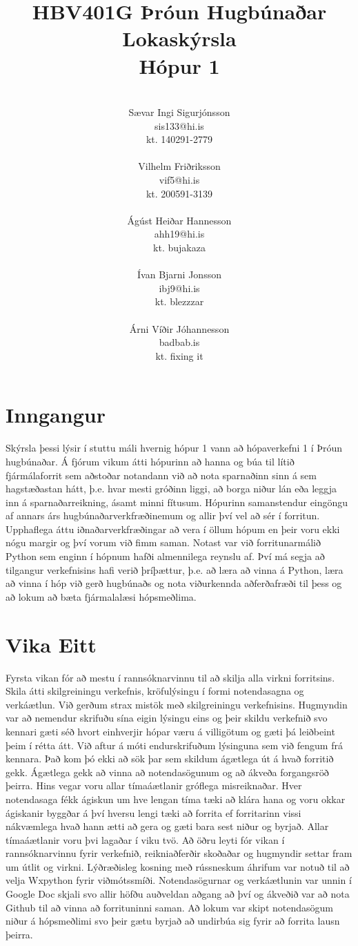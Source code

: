 \documentclass[a4paper, 12 pt]{article}
\title{HBV401G Þróun Hugbúnaðar\\ 
	Lokaskýrsla \\
	Hópur 1	
}
\author{\\Sævar Ingi Sigurjónsson \\
	sis133@hi.is\\
	kt. 140291-2779\\
	\\
	Vilhelm Friðriksson\\
	vif5@hi.is\\
	kt. 200591-3139\\
	\\	
	Ágúst Heiðar Hannesson\\
	ahh19@hi.is\\
	kt. bujakaza\\
	\\
	Ívan Bjarni Jonsson\\
	ibj9@hi.is\\
	kt. blezzzar\\
	\\
	Árni Víðir Jóhannesson\\
	badbab.is\\
	kt. fixing it\\
}
\begin{document}
\maketitle
\pagebreak

\section{Inngangur}
Skýrsla þessi lýsir í stuttu máli hvernig hópur 1 vann að hópaverkefni 1 í Þróun hugbúnaðar.  Á fjórum vikum átti hópurinn að hanna og búa til lítið fjármálaforrit sem aðstoðar notandann við að nota sparnaðinn sinn á sem hagstæðastan hátt, þ.e. hvar mesti gróðinn liggi, að borga niður lán eða leggja inn á sparnaðarreikning, ásamt minni fítusum.  Hópurinn samanstendur eingöngu af annars árs hugbúnaðarverkfræðinemum og allir því vel að sér í forritun.  Upphaflega áttu iðnaðarverkfræðingar að vera í öllum hópum en þeir voru ekki nógu margir og því vorum við fimm saman. Notast var við forritunarmálið Python sem enginn í hópnum hafði almennilega reynslu af.  Því má segja að tilgangur verkefnisins hafi verið þríþættur, þ.e. að læra að vinna á Python, læra að vinna í hóp við gerð hugbúnaðs og nota viðurkennda aðferðafræði til þess og að lokum að bæta fjármalalæsi hópsmeðlima.



\section{Vika Eitt}
Fyrsta vikan fór að mestu í rannsóknarvinnu til að skilja alla virkni forritsins.  Skila átti skilgreiningu verkefnis, kröfulýsingu í formi notendasagna og verkáætlun.  Við gerðum strax mistök með skilgreiningu verkefnisins.  Hugmyndin var að nemendur skrifuðu sína eigin lýsingu eins og þeir skildu verkefnið svo kennari gæti séð hvort einhverjir hópar væru á villigötum og gæti þá leiðbeint þeim í rétta átt.  Við aftur á móti endurskrifuðum lýsinguna sem við fengum frá kennara.  Það kom þó ekki að sök þar sem skildum ágætlega út á hvað forritið gekk.  Ágætlega gekk að vinna að notendasögunum og að ákveða forgangsröð þeirra.  Hins vegar voru allar tímaáætlanir gróflega misreiknaðar.  Hver notendasaga fékk ágiskun um hve lengan tíma tæki að klára hana og voru okkar ágiskanir byggðar á því hversu lengi tæki að forrita ef forritarinn vissi nákvæmlega hvað hann ætti að gera og gæti bara sest niður og byrjað.  Allar tímaáætlanir voru þvi lagaðar í viku tvö.  
Að öðru leyti fór vikan í rannsóknarvinnu fyrir verkefnið, reikniaðferðir skoðaðar og hugmyndir settar fram um útlit og virkni.  Lýðræðisleg kosning með rússneskum áhrifum var notuð til að velja Wxpython fyrir viðmótssmíði.  Notendasögurnar og verkáætlunin var unnin í Google Doc skjali svo allir höfðu auðveldan aðgang að því og ákveðið var að nota Github til að vinna að forrituninni saman.  Að lokum var skipt notendasögum niður á hópsmeðlimi svo þeir gætu byrjað að undirbúa sig fyrir að forrita lausn þeirra.
\end{document}
